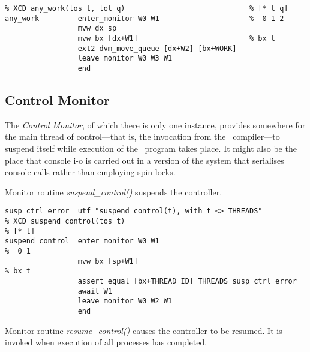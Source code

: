 {\small
\begin{verbatim}
% XCD any_work(tos t, tot q)                             % [* t q]
any_work         enter_monitor W0 W1                     %  0 1 2
                 mvw dx sp
                 mvw bx [dx+W1]                          % bx t
                 ext2 dvm_move_queue [dx+W2] [bx+WORK]
                 leave_monitor W0 W3 W1
                 end
\end{verbatim}}

\begin{tabbing}
\indents
\finmon
\end{tabbing}



\subsection{Control Monitor}
The \emph{Control Monitor}, of which there is only one instance, provides somewhere for the main thread of control---that is, the invocation from the \jit\ compiler---to suspend itself while execution of the \desi\ program takes place.
It might also be the place that console i-o is carried out in a version of the system that serialises console calls rather than employing spin-locks.

Monitor routine \emph{suspend\_control()} suspends the controller.

\begin{tabbing}
\indents
{}
\ooooo{}
\finmore
\end{tabbing}

{\small
\begin{verbatim}
susp_ctrl_error  utf "suspend_control(t), with t <> THREADS"
% XCD suspend_control(tos t)                                          % [* t]
suspend_control  enter_monitor W0 W1                                  %  0 1
                 mvw bx [sp+W1]                                       % bx t
                 assert_equal [bx+THREAD_ID] THREADS susp_ctrl_error
                 await W1
                 leave_monitor W0 W2 W1
                 end
\end{verbatim}}

Monitor routine \emph{resume\_control()} causes the controller to be resumed. 
It is invoked when execution of all processes has completed.

